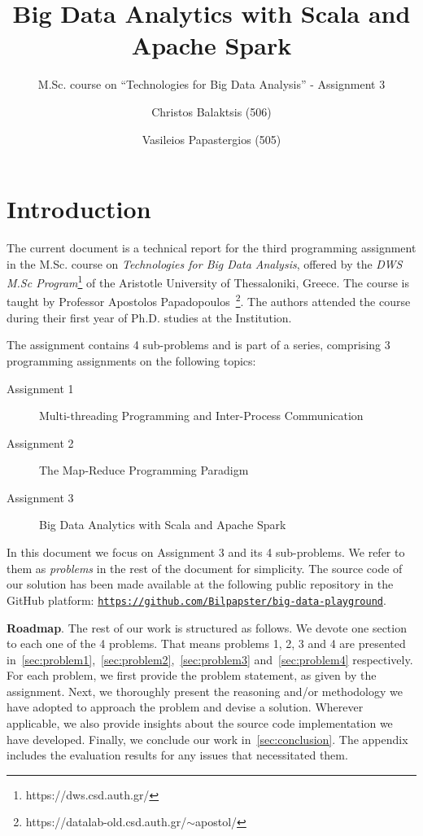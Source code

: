 \documentclass[acmlarge]{acmart}
\begin{document}
  \title{Big Data Analytics with Scala and Apache Spark}
  \subtitle{M.Sc. course on ``Technologies for Big Data Analysis'' - Assignment 3}

  \author{Christos Balaktsis (506)}
  \author{Vasileios Papastergios (505)}

  \renewcommand{\shortauthors}{C. Balaktsis and V. Papastergios}
  \maketitle

  \section{Introduction}

  The current document is a technical report for the third programming assignment in the M.Sc. course on
  \emph{Technologies for Big Data Analysis}, offered by the \emph{DWS M.Sc Program}\footnote{https://dws.csd.auth.gr/} of the Aristotle University of Thessaloniki, Greece. The course is taught by Professor Apostolos Papadopoulos~\footnote{https://datalab-old.csd.auth.gr/$\sim$apostol/}. The authors attended the course during their first year of Ph.D. studies at the Institution.

  The assignment contains 4 sub-problems and is part of a series, comprising 3 programming assignments on the following topics:
  \begin{description}
    \item[Assignment 1] Multi-threading Programming and Inter-Process Communication
    \item[Assignment 2] The Map-Reduce Programming Paradigm
    \item[Assignment 3] Big Data Analytics with Scala and Apache Spark
  \end{description}
  In this document we focus on Assignment 3 and its 4 sub-problems.
  We refer to them as \emph{problems} in the rest of the document for simplicity.
  The source code of our solution has been made available at the following public repository in the GitHub platform: \href{https://github.com/Bilpapster/big-data-playground}{\texttt{\small https://github.com/Bilpapster/big-data-playground}}.

  \textbf{Roadmap}.
  The rest of our work is structured as follows.
  We devote one section to each one of the 4 problems.
  That means problems 1, 2, 3 and 4 are presented in~\autoref{sec:problem1},~\autoref{sec:problem2},~\autoref{sec:problem3} and~\autoref{sec:problem4} respectively.
  For each problem, we first provide the problem statement, as given by the assignment.
  Next, we thoroughly present the reasoning and/or methodology we have adopted to approach the problem and devise a solution.
  Wherever applicable, we also provide insights about the source code implementation we have developed.
  Finally, we conclude our work in~\autoref{sec:conclusion}.
  The appendix includes the evaluation results for any issues that necessitated them.
\end{document}
